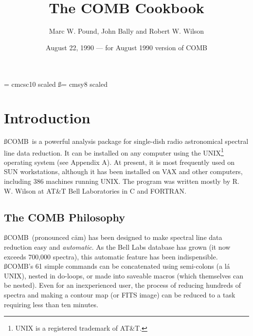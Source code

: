 \def\deg{\ifmmode{^\circ} 		%
    \else{$^\circ$}\fi}
\def\arcm{\ifmmode{^\prime}   		%
    \else{$^\prime$}\fi}
\def\arcs{\ifmmode{^{\prime\prime}} 	%
    \else{$^{\prime\prime}$}\fi}

\pagestyle{headings}

\oddsidemargin 0.0pt
\textwidth 6.25in
\textheight 8.25in
\font\twlsc  = cmcsc10 scaled  %
\font\ss = cmsy8 scaled
\def\COMB{{\ss COMB\/}\ } 		%
\def\C{{\ss COMB\/}} 			%

\title{The COMB Cookbook}
\author{Marc W. Pound, John Bally and Robert W. Wilson}
\date{August 22, 1990 --- for August 1990 version of COMB}


\maketitle
\tableofcontents
\newpage
\section{Introduction}
\label{sec-intro}%

\COMB is a powerful analysis package for single-dish radio astronomical
spectral line data reduction.  It can be installed on any computer
using the UNIX\footnote{UNIX is a registered trademark of AT\&T.}  
operating system (see Appendix A).  At present, it is most 
frequently used on SUN workstations, although it has been installed on 
VAX and other computers, including 386 machines running UNIX.
The program was written mostly by R. W. Wilson 
at AT\&T Bell Laboratories in C and FORTRAN.

\subsection{The COMB Philosophy}
\COMB (pronounced c\"{a}m) has been designed to make spectral 
line data reduction easy and
{\em automatic}. As the Bell Labs database has grown (it now exceeds 700,000
spectra), this automatic feature has been indispensible. \C's 61 simple
commands can be concatenated using semi-colons (a l\'a UNIX), nested in 
do-loops, or made into saveable macros (which themselves can be nested).
Even for an inexperienced user, the process of reducing hundreds of spectra
and making a contour map (or FITS image) can be reduced to a task requiring 
less than ten minutes.

